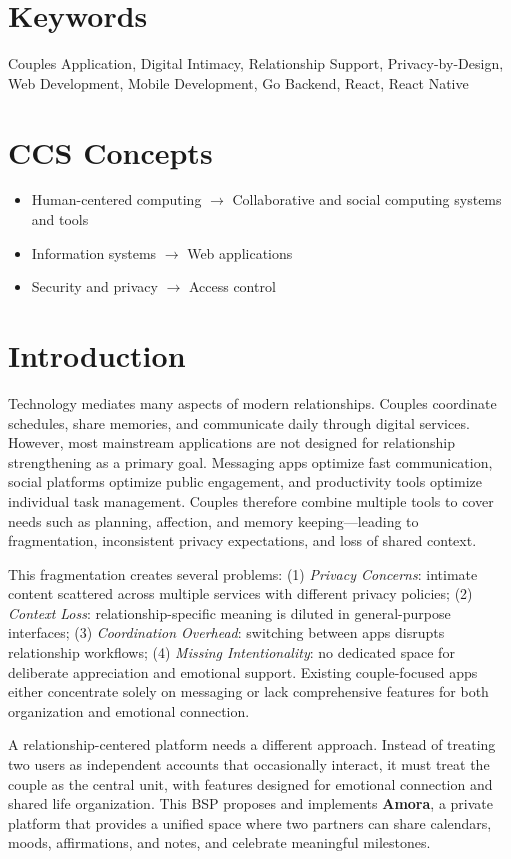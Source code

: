 \documentclass[sigconf, authorversion, nonacm, margin=0.75in]{acmart}
\begin{document}
\section*{Keywords}
Couples Application, Digital Intimacy, Relationship Support, Privacy-by-Design, Web Development, Mobile Development, Go Backend, React, React Native

\section*{CCS Concepts}
\begin{itemize}
\item Human-centered computing $\rightarrow$ Collaborative and social computing systems and tools
\item Information systems $\rightarrow$ Web applications
\item Security and privacy $\rightarrow$ Access control
\end{itemize}

\section{Introduction}
Technology mediates many aspects of modern relationships. Couples coordinate schedules, share memories, and communicate daily through digital services. However, most mainstream applications are not designed for relationship strengthening as a primary goal. Messaging apps optimize fast communication, social platforms optimize public engagement, and productivity tools optimize individual task management. Couples therefore combine multiple tools to cover needs such as planning, affection, and memory keeping—leading to fragmentation, inconsistent privacy expectations, and loss of shared context.

This fragmentation creates several problems: (1) \textit{Privacy Concerns}: intimate content scattered across multiple services with different privacy policies; (2) \textit{Context Loss}: relationship-specific meaning is diluted in general-purpose interfaces; (3) \textit{Coordination Overhead}: switching between apps disrupts relationship workflows; (4) \textit{Missing Intentionality}: no dedicated space for deliberate appreciation and emotional support. Existing couple-focused apps either concentrate solely on messaging or lack comprehensive features for both organization and emotional connection.

A relationship-centered platform needs a different approach. Instead of treating two users as independent accounts that occasionally interact, it must treat the couple as the central unit, with features designed for emotional connection and shared life organization. This BSP proposes and implements \textbf{Amora}, a private platform that provides a unified space where two partners can share calendars, moods, affirmations, and notes, and celebrate meaningful milestones.
\end{document}
